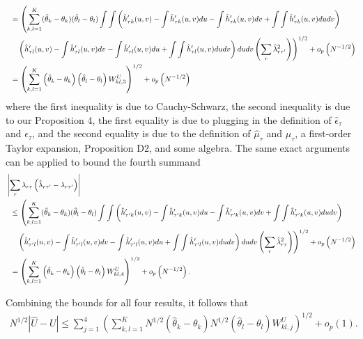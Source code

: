 \documentclass[12pt]{article}
\theoremstyle{definition}
\begin{document}
{\begin{align*}
&\hspace{2mm} = \left(\sum_{k,l=1}^{K}(\hat{\theta}_{k} - \theta_{k})(\hat{\theta}_{l} - \theta_{l})\int\int\left(\hat{h}'_{\tau k}(u,v) - \int\hat{h}'_{\tau k}(u,v)du - \int\hat{h}'_{\tau k}(u,v)dv + \int\int\hat{h}'_{\tau k}(u,v)dudv\right)\right.\\
&\hspace{5mm}\left.\left(\hat{h}'_{\tau l}(u,v) - \int\hat{h}'_{\tau l}(u,v)dv - \int\hat{h}'_{\tau l}(u,v)du  + \int\int\hat{h}'_{\tau l}(u,v)dudv\right)dudv \left(\sum_{r} \hat{\lambda}_{r\tau'}^{2}\right)\right)^{1/2} + o_{p}\left(N^{-1/2}\right) \\
&\hspace{2mm} =  \left(\sum_{k,l=1}^{K} \left(\hat{\theta}_{k} - \theta_{k}\right)\left(\hat{\theta}_{l} - \theta_{l}\right)W^{U}_{kl,3}\right)^{1/2}  + o_{p}\left( N^{-1/2}\right)
\end{align*}
where the first inequality is due to Cauchy-Schwarz, the second inequality is due to our Proposition 4, the first equality is due to plugging in the definition of $\hat{\epsilon}_{\tau}$ and $\epsilon_{\tau}$, and the second equality is due to the definition of $\hat{\mu}_\tau$ and $\mu_\tau$, a first-order Taylor expansion, Proposition D2, and some algebra. The same exact arguments can be applied to bound the fourth summand 
\begin{align*}
&\left|\sum_{r}\lambda_{r\tau}\left(\hat{\lambda}_{r\tau'} - \lambda_{r\tau'}\right) \right| \\
&\hspace{2mm}\leq \left(\sum_{k,l=1}^{K}(\hat{\theta}_{k} - \theta_{k})(\hat{\theta}_{l} - \theta_{l})\int\int\left(\hat{h}'_{\tau' k}(u,v) - \int\hat{h}'_{\tau' k}(u,v)du  - \int\hat{h}'_{\tau' k}(u,v)dv + \int\int\hat{h}'_{\tau' k}(u,v)dudv\right)\right.\\
&\hspace{5mm}\left.\left(\hat{h}'_{\tau' l}(u,v) - \int\hat{h}'_{\tau' l}(u,v)dv - \int\hat{h}'_{\tau' l}(u,v)du  + \int\int\hat{h}'_{\tau' l}(u,v)dudv\right)dudv \left(\sum_{r} \hat{\lambda}_{r\tau}^{2}\right)\right)^{1/2} + o_{p}\left(N^{-1/2}\right) \\
&\hspace{2mm} =  \left(\sum_{k,l=1}^{K} \left(\hat{\theta}_{k} - \theta_{k}\right)\left(\hat{\theta}_{l} - \theta_{l}\right)W^{U}_{kl,4}\right)^{1/2}  + o_{p}\left( N^{-1/2}\right).
\end{align*}

Combining the bounds for all four results, it follows that 
\begin{align*}
N^{1/2}|\hat{U} - U| \leq \sum_{j = 1}^{4} \left(\sum_{k,l=1}^{K} N^{1/2}\left(\hat{\theta}_{k} - \theta_{k}\right)N^{1/2}\left(\hat{\theta}_{l} - \theta_{l}\right)W^{U}_{kl,j}\right)^{1/2}  + o_{p}\left(1\right).
\end{align*}

}
\end{document}
